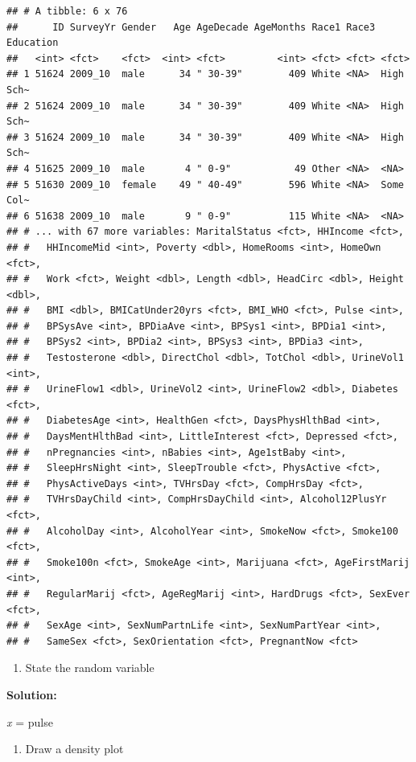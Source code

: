 \documentclass[]{book}
\providecommand{\tightlist}{%
  \setlength{\itemsep}{0pt}\setlength{\parskip}{0pt}}
\begin{document}
\begin{verbatim}
## # A tibble: 6 x 76
##      ID SurveyYr Gender   Age AgeDecade AgeMonths Race1 Race3 Education
##   <int> <fct>    <fct>  <int> <fct>         <int> <fct> <fct> <fct>    
## 1 51624 2009_10  male      34 " 30-39"        409 White <NA>  High Sch~
## 2 51624 2009_10  male      34 " 30-39"        409 White <NA>  High Sch~
## 3 51624 2009_10  male      34 " 30-39"        409 White <NA>  High Sch~
## 4 51625 2009_10  male       4 " 0-9"           49 Other <NA>  <NA>     
## 5 51630 2009_10  female    49 " 40-49"        596 White <NA>  Some Col~
## 6 51638 2009_10  male       9 " 0-9"          115 White <NA>  <NA>     
## # ... with 67 more variables: MaritalStatus <fct>, HHIncome <fct>,
## #   HHIncomeMid <int>, Poverty <dbl>, HomeRooms <int>, HomeOwn <fct>,
## #   Work <fct>, Weight <dbl>, Length <dbl>, HeadCirc <dbl>, Height <dbl>,
## #   BMI <dbl>, BMICatUnder20yrs <fct>, BMI_WHO <fct>, Pulse <int>,
## #   BPSysAve <int>, BPDiaAve <int>, BPSys1 <int>, BPDia1 <int>,
## #   BPSys2 <int>, BPDia2 <int>, BPSys3 <int>, BPDia3 <int>,
## #   Testosterone <dbl>, DirectChol <dbl>, TotChol <dbl>, UrineVol1 <int>,
## #   UrineFlow1 <dbl>, UrineVol2 <int>, UrineFlow2 <dbl>, Diabetes <fct>,
## #   DiabetesAge <int>, HealthGen <fct>, DaysPhysHlthBad <int>,
## #   DaysMentHlthBad <int>, LittleInterest <fct>, Depressed <fct>,
## #   nPregnancies <int>, nBabies <int>, Age1stBaby <int>,
## #   SleepHrsNight <int>, SleepTrouble <fct>, PhysActive <fct>,
## #   PhysActiveDays <int>, TVHrsDay <fct>, CompHrsDay <fct>,
## #   TVHrsDayChild <int>, CompHrsDayChild <int>, Alcohol12PlusYr <fct>,
## #   AlcoholDay <int>, AlcoholYear <int>, SmokeNow <fct>, Smoke100 <fct>,
## #   Smoke100n <fct>, SmokeAge <int>, Marijuana <fct>, AgeFirstMarij <int>,
## #   RegularMarij <fct>, AgeRegMarij <int>, HardDrugs <fct>, SexEver <fct>,
## #   SexAge <int>, SexNumPartnLife <int>, SexNumPartYear <int>,
## #   SameSex <fct>, SexOrientation <fct>, PregnantNow <fct>
\end{verbatim}

\begin{enumerate}
\def\labelenumi{\alph{enumi}.}
\tightlist
\item
  State the random variable
\end{enumerate}

\textbf{Solution:}

\emph{x} = pulse

\begin{enumerate}
\def\labelenumi{\alph{enumi}.}
\setcounter{enumi}{1}
\tightlist
\item
  Draw a density plot
\end{enumerate}
\end{document}
